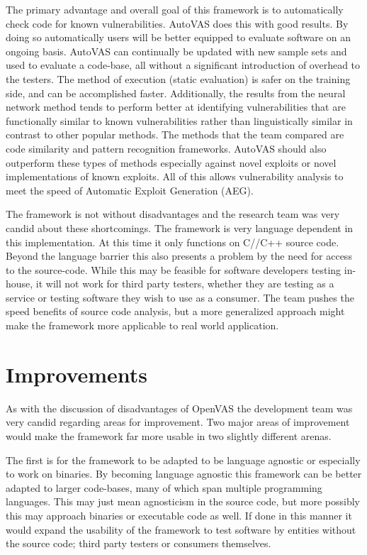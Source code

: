 \documentclass[]{article}
\begin{document}
The primary advantage and overall goal of this framework is to automatically check code for known vulnerabilities. 
AutoVAS does this with good results.
By doing so automatically users will be better equipped to evaluate software on an ongoing basis.
AutoVAS can continually be updated with new sample sets and used to evaluate a code-base, all without a significant introduction of overhead to the testers.
The method of execution (static evaluation) is safer on the training side, and can be accomplished faster.
Additionally, the results from the neural network method tends to perform better at identifying vulnerabilities that are functionally similar to known vulnerabilities rather than linguistically similar in contrast to other popular methods.
The methods that the team compared are code similarity and pattern recognition frameworks. 
AutoVAS should also outperform these types of methods especially against novel exploits or novel implementations of known exploits.
All of this allows vulnerability analysis to meet the speed of Automatic Exploit Generation (AEG).

The framework is not without disadvantages and the research team was very candid about these shortcomings.
The framework is very language dependent in this implementation.
At this time it only functions on C//C++ source code.
Beyond the language barrier this also presents a problem by the need for access to the source-code.
While this may be feasible for software developers testing in-house, it will not work for third party testers, whether they are testing as a service or testing software they wish to use as a consumer.
The team pushes the speed benefits of source code analysis, but a more generalized approach might make the framework more applicable to real world application.

\section{Improvements}

As with the discussion of disadvantages of OpenVAS the development team was very candid regarding areas for improvement.
Two major areas of improvement would make the framework far more usable in two slightly different arenas.

The first is for the framework to be adapted to be language agnostic or especially to work on binaries.
By becoming language agnostic this framework can be better adapted to larger code-bases, many of which span multiple programming languages. 
This may just mean agnosticism in the source code, but more possibly this may approach binaries or executable code as well.
If done in this manner it would expand the usability of the framework to test software by entities without the source code; third party testers or consumers themselves.
\end{document}
